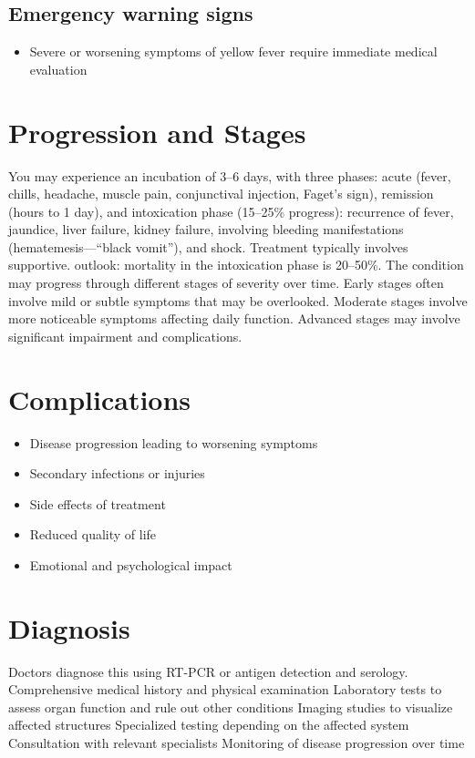 \subsection{Emergency warning signs}
\begin{itemize}[noitemsep]
  \item Severe or worsening symptoms of yellow fever require immediate medical evaluation
\end{itemize}
\section{Progression and Stages}
You may experience an incubation of 3--6 days, with three phases: acute (fever, chills, headache, muscle pain, conjunctival injection, Faget's sign), remission (hours to 1 day), and intoxication phase (15--25\% progress): recurrence of fever, jaundice, liver failure, kidney failure, involving bleeding manifestations (hematemesis---``black vomit''), and shock. Treatment typically involves supportive. outlook: mortality in the intoxication phase is 20--50\%. The condition may progress through different stages of severity over time. Early stages often involve mild or subtle symptoms that may be overlooked. Moderate stages involve more noticeable symptoms affecting daily function. Advanced stages may involve significant impairment and complications.
\section{Complications}
\begin{itemize}[noitemsep]
  \item Disease progression leading to worsening symptoms
  \item Secondary infections or injuries
  \item Side effects of treatment
  \item Reduced quality of life
  \item Emotional and psychological impact
\end{itemize}
\section{Diagnosis}
Doctors diagnose this using RT-PCR or antigen detection and serology. Comprehensive medical history and physical examination Laboratory tests to assess organ function and rule out other conditions Imaging studies to visualize affected structures Specialized testing depending on the affected system Consultation with relevant specialists Monitoring of disease progression over time

